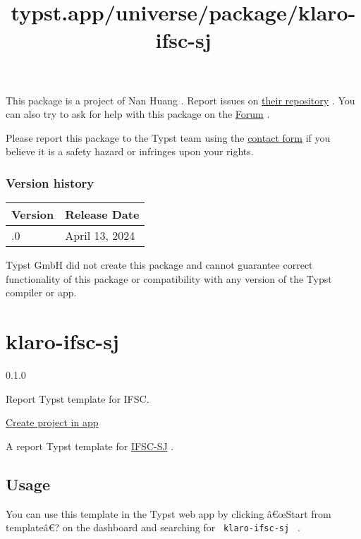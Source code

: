 This package is a project of Nan Huang . Report issues on
\href{https://github.com/TeddyHuang-00/typpuccino}{their repository} .
You can also try to ask for help with this package on the
\href{https://forum.typst.app}{Forum} .

Please report this package to the Typst team using the
\href{https://typst.app/contact}{contact form} if you believe it is a
safety hazard or infringes upon your rights.

\label{versions}
\subsubsection{Version history}\label{version-history}

\begin{longtable}[]{@{}ll@{}}
\toprule\noalign{}
Version & Release Date \\
\midrule\noalign{}
\endhead
\bottomrule\noalign{}
\endlastfoot
0.1.0 & April 13, 2024 \\
\end{longtable}

Typst GmbH did not create this package and cannot guarantee correct
functionality of this package or compatibility with any version of the
Typst compiler or app.


\title{typst.app/universe/package/klaro-ifsc-sj}

\label{banner}
\label{template-thumbnail}

\section{klaro-ifsc-sj}\label{klaro-ifsc-sj}

{ 0.1.0 }

Report Typst template for IFSC.

\href{/app?template=klaro-ifsc-sj&version=0.1.0}{Create project in app}

\label{readme}
A report Typst template for \href{https://sj.ifsc.edu.br/}{IFSC-SJ} .

\subsection{Usage}\label{usage}

You can use this template in the Typst web app by clicking â€œStart from
templateâ€? on the dashboard and searching for
\texttt{\ klaro-ifsc-sj\ } .

